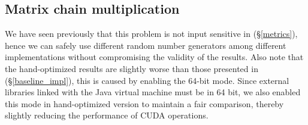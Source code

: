 \def\hh{\normalsize\bf}
\def\hl#1#2{\begin{minipage}{3.5cm} {\bf #1} \\[-2pt] \footnotesize #2 \vspace{6pt} \end{minipage}}
\def\hdps{\hl{DynaProg}{Scala parsers}}
\def\hdpc{\hl{DynaProg}{CUDA parsers}}
\def\hdpcz{\hl{DynaProg}{CUDA-Zuker}}
\def\hdpcr{\hl{DynaProg}{CUDA-RNAfold}}
\def\hhoc{\hl{Optimized}{C, single thread}}
\def\hhog{\hl{Optimized}{CUDA, 64-bit}}
\def\hgapc{\hl{GAPC}{\cite{gapc_thesis}, C, single thread}}
\def\hatlp{\hl{ATLP}{\cite{gpu_atlp}, rescaled$^{(1)}$}}
\def\hcua{\hl{CUDAlign}{\cite{swat_linear}, version 2.0}}
\def\hvien{\hl{ViennaRNA}{\cite{vienna_rna}}}
\def\hrna{\hl{RNAfold}{\cite{gpu_rnafold}, leveraging \cite{adp_gpu}}}

\def\hcpu{\midrule \multirow{4}{*}{\rotatebox{90}{\normalsize\bf CPU $\quad$}}}
\def\hgpu{\midrule \multirow{4}{*}{\rotatebox{90}{\normalsize\bf GPU $\quad$}}}

\subsection{Matrix chain multiplication}
We have seen previously that this problem is not input sensitive in (\S\ref{metrics}), hence we can safely use different random number generators among different implementations without compromising the validity of the results.  Also note that the hand-optimized results are slightly worse than those presented in (\S\ref{baseline_impl}), this is caused by enabling the 64-bit mode. Since external libraries linked with the Java virtual machine must be in 64 bit, we also enabled this mode in hand-optimized version to maintain a fair comparison, thereby slightly reducing the performance of CUDA operations.

